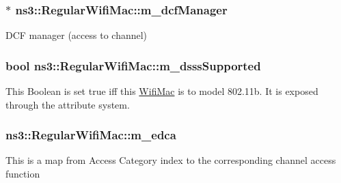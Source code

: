 \subsubsection[{\texorpdfstring{m\+\_\+dcf\+Manager}{m_dcfManager}}]{$\ast$ ns3\+::\+Regular\+Wifi\+Mac\+::m\+\_\+dcf\+Manager\hspace{0.3cm}{\ttfamily [protected]}}\hypertarget{classns3_1_1RegularWifiMac_affcfccaae7c9ff15df0ad6752df95a16}{}\label{classns3_1_1RegularWifiMac_affcfccaae7c9ff15df0ad6752df95a16}


D\+CF manager (access to channel) 

\subsubsection[{\texorpdfstring{m\+\_\+dsss\+Supported}{m_dsssSupported}}]{\setlength{\rightskip}{0pt plus 5cm}bool ns3\+::\+Regular\+Wifi\+Mac\+::m\+\_\+dsss\+Supported\hspace{0.3cm}{\ttfamily [protected]}}\hypertarget{classns3_1_1RegularWifiMac_ab6ce267a1e23e9c1d84908e07831bd6d}{}\label{classns3_1_1RegularWifiMac_ab6ce267a1e23e9c1d84908e07831bd6d}
This Boolean is set {\ttfamily true} iff this \hyperlink{classns3_1_1WifiMac}{Wifi\+Mac} is to model 802.\+11b. It is exposed through the attribute system. 
\subsubsection[{\texorpdfstring{m\+\_\+edca}{m_edca}}]{ ns3\+::\+Regular\+Wifi\+Mac\+::m\+\_\+edca\hspace{0.3cm}{\ttfamily [protected]}}\hypertarget{classns3_1_1RegularWifiMac_ac750365ab3708902cc0b7700164c706d}{}\label{classns3_1_1RegularWifiMac_ac750365ab3708902cc0b7700164c706d}
This is a map from Access Category index to the corresponding channel access function 
